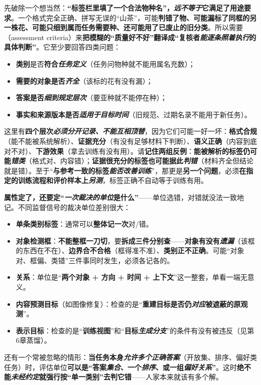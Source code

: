 先破除一个想当然：\textbf{“标签栏里填了一个合法物种名”，\emph{远不等于}它满足了用途要求}。一个格式完全正确、拼写无误的“山茶”，可能\textbf{判错了物、可能漏标了同框的另一株花、可能只细到属而任务需要种、还可能用了已废止的旧分类}。所以需要（assessment criteria）来\textbf{把模糊的“质量好不好”翻译成“复核者\emph{能逐条照着执行}的具体判断”}。它至少要回答四类问题：
\begin{itemize}\item \textbf{类别}是否\textbf{符合\emph{任务定义}}（任务问物种就不能用属名充数）；\item \textbf{需要的对象是否\emph{齐全}}（该标的花有没有漏）；\item \textbf{答案是否\emph{细到规定层次}}（要亚种就不能停在种）；\item \textbf{事实和来源版本是否\emph{适用于目标时间}}（旧规范、过期名录不能用于新任务）。\end{itemize}
这里有\textbf{四个层次\emph{必须分开记录、不能互相顶替}}，因为它们可能一好一坏：\textbf{格式合规}（能不能被系统解析）、\textbf{证据充分}（有没有足够材料下判断）、\textbf{语义正确}（内容到底对不对）、\textbf{下游效果}（拿去训练有没有用）。请\textbf{记住两组反例}：\textbf{能被解析的标签仍可能\emph{错类}}（格式对、内容错）；\textbf{证据很充分的标签也可能据此\emph{判错}}（材料齐全但结论就是错）。至于“\textbf{与参考一致的标签\emph{能否改善训练}}”，那更是\textbf{另一个问题}，必须\textbf{在指定的训练流程和评价样本上\emph{另测}}，标签正确不自动等于训练有用。

\textbf{属性定了，还要定“\emph{一次裁决的\emph{单位}}是什么”}——单位选错，对错就没法一致地记。不同监督信号的裁决单位差别很大：
\begin{itemize}\item \textbf{单条类别标签}：通常可以\textbf{整体记一次}对/错。\item \textbf{对象检测框}：\textbf{不能整框一刀切}，要\textbf{拆成三件分别查}——\textbf{对象有没有\emph{遗漏}}（该框的东西在不在）、\textbf{边界合不合格}（框得准不准）、\textbf{类别正不正确}。可能“对象对、框偏、类错”三件事同时发生，必须各记各的。\item \textbf{关系}：单位是“\textbf{两个对象 + 方向 + 时间 + 上下文}”这一整套，单看一端无意义。\item \textbf{内容预测目标}（如图像修复）：检查的是“\textbf{重建目标是否仍\emph{对应}被遮蔽的原观测}”。\item \textbf{表示目标}：检查的是“\textbf{训练视图}”和“\textbf{目标\emph{生成分支}}”的条件有没有被违反（见第6章蒸馏）。\end{itemize}
还有一个常被忽略的情形：\textbf{当任务本身\emph{允许多个正确答案}}（开放集、排序、偏好类任务）时，评估单位\textbf{可以是“答案\emph{集合}、一个\emph{排序}、或一组\emph{偏好关系}”}。这时\textbf{绝不能\emph{未经约定}就强行按“单一类别”去判它错}——人家本来就该有多个解。

